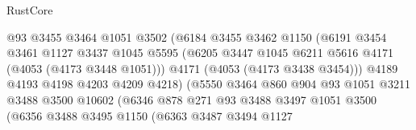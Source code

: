 \begin{lexlean}{RustCore}
\begin{coremodule}
                                    @93
                                    @3455
                                    @3464
                                    @1051
                                    @3502
                                    (@6184
                                      @3455
                                      @3462
                                      @1150
                                      (@6191
                                        @3454
                                        @3461
                                        @1127
                                        @3437
                                        @1045
                                        @5595
                                        (@6205
                                          @3447
                                          @1045
                                          @6211
                                          @5616
                                          @4171
                                          (@4053 (@4173 @3448 @1051)))
                                        @4171
                                        (@4053 (@4173 @3438 @3454)))
                                      @4189
                                      @4193
                                      @4198
                                      @4203
                                      @4209
                                      @4218)
                                    (@5550
                                      @3464
                                      @860
                                      @904
                                      @93
                                      @1051
                                      @3211
                                      @3488
                                      @3500
                                      @10602
                                      (@6346
                                        @878
                                        @271
                                        @93
                                        @3488
                                        @3497
                                        @1051
                                        @3500
                                        (@6356
                                          @3488
                                          @3495
                                          @1150
                                          (@6363
                                            @3487
                                            @3494
                                            @1127

\end{coremodule}
\end{lexlean}
